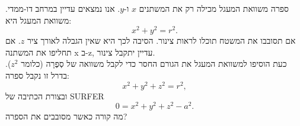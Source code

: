 \begin{surferPage}[הספרה]{ספרה}
משוואת המעגל מכילה רק את המשתנים $x$ ו-$y$. אנו נמצאים עדיין במרחב דו-ממדי.
משוואת המעגל היא:
\[x^2+y^2=r^2.\]
אם תסובבו את המשטח תוכלו לראות צינור. הסיבה לכך היא שאין הגבלה לאורך ציר $z$. אם תחליפו את המשתנה x ב-z, עדיין יתקבל צינור.\\
כעת הוסיפו למשוואת המעגל את הגורם החסר כדי לקבל משוואה של סְפֶרָה (כלומר $z^2$).
בדרל זו נקבל ספרה:
\[x^2+y^2+z^2=r^2,\]
ובצורת הכתיבה של SURFER
\[0=x^2+y^2+z^2-a^2.\]
מה קורה כאשר מסובבים את הספרה?
\end{surferPage}
